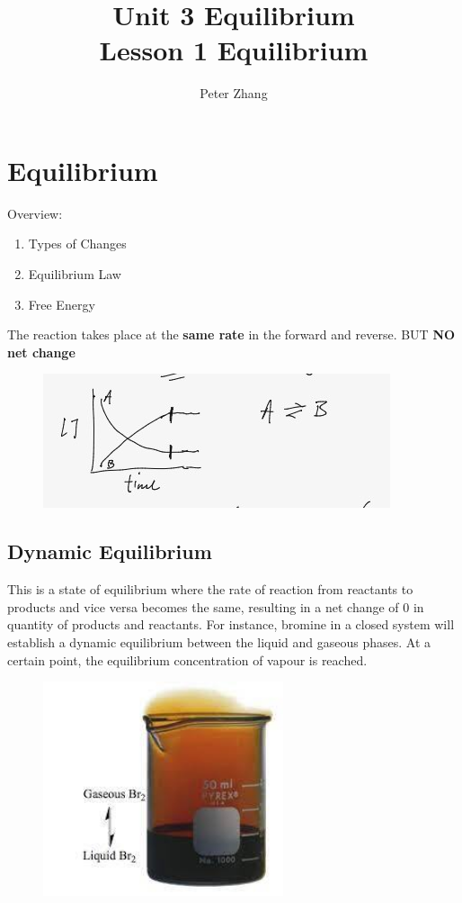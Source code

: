 \documentclass{article}
\title{Unit 3 Equilibrium\\Lesson 1 Equilibrium}
\author{Peter Zhang}
\begin{document}
\maketitle
\newpage
\tableofcontents
\newpage


\section{Equilibrium}
Overview:\begin{enumerate}\item Types of Changes \item Equilibrium Law\item Free Energy\end{enumerate}

The reaction takes place at the \textbf{same rate} in the forward and reverse. BUT \textbf{NO net change}

\begin{figure}[H]
\centering
\includegraphics[width=\textwidth]{3.1figu1.jpg}
\end{figure}

\pagebreak

\subsection{Dynamic Equilibrium}
This is a state of equilibrium where the rate of reaction from reactants to products and vice versa becomes the same, resulting in a net change of 0 in quantity of products and reactants. For instance, bromine in a closed system will establish a dynamic equilibrium between the liquid and gaseous phases. At a certain point, the equilibrium concentration of vapour is reached.

\begin{figure}[H]
\centering
\includegraphics[width=200pt]{3.1bromine.jpg}
\end{figure}
\end{document}
